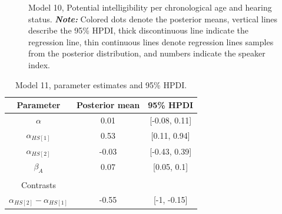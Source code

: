 \documentclass[
  authoryear,
  preprint,
  1p]{elsarticle}
\begin{document}
\label{cell-fig-rq3-intelligibility-model10}
\begin{figure}[H]


\caption{\label{fig-rq3-intelligibility-model10}Model 10, Potential
intelligibility per chronological age and hearing status.
\textbf{\emph{Note:}} Colored dots denote the posterior means, vertical
lines describe the 95\% HPDI, thick discontinuous line indicate the
regression line, thin continuous lines denote regression lines samples
from the posterior distribution, and numbers indicate the speaker
index.}

\end{figure}%

\begin{longtable}[]{@{}ccc@{}}

\caption{\label{tbl-parameter-model11}Model 11, parameter estimates and
95\% HPDI.}

\tabularnewline

\toprule\noalign{}
Parameter & Posterior mean & 95\% HPDI \\
\midrule\noalign{}
\endhead
\bottomrule\noalign{}
\endlastfoot
\(\alpha\) & 0.01 & {[}-0.08, 0.11{]} \\
\(\alpha_{HS[1]}\) & 0.53 & {[}0.11, 0.94{]} \\
\(\alpha_{HS[2]}\) & -0.03 & {[}-0.43, 0.39{]} \\
\(\beta_{A}\) & 0.07 & {[}0.05, 0.1{]} \\
& & \\
Contrasts & & \\
\(\alpha_{HS[2]} - \alpha_{HS[1]}\) & -0.55 & {[}-1, -0.15{]} \\

\end{longtable}
\end{document}
